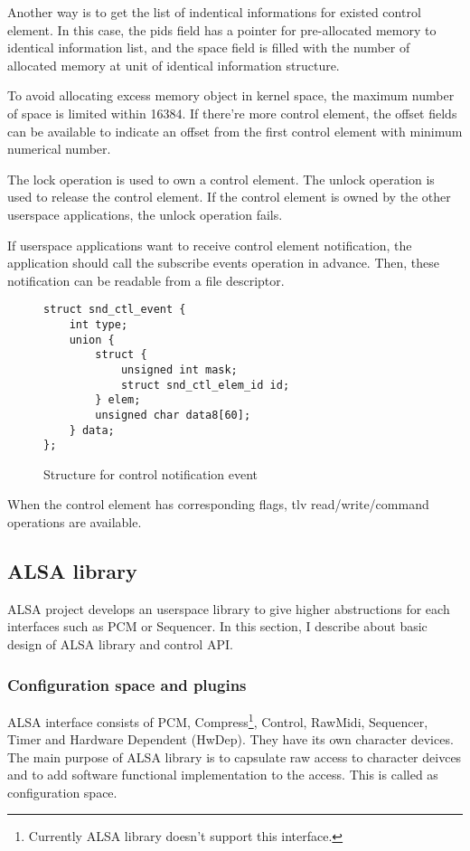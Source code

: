 \documentclass[onecolumn]{article}
\begin{document}
Another way is to get the list of indentical informations for existed control element. In this case, the pids field has a pointer for pre-allocated memory to identical information list, and the space field is filled with the number of allocated memory at unit of identical information structure.

To avoid allocating excess memory object in kernel space, the maximum number of space is limited within 16384. If there're more control element, the offset fields can be available to indicate an offset from the first control element with minimum numerical number.

The lock operation is used to own a control element. The unlock operation is used to release the control element. If the control element is owned by the other userspace applications, the unlock operation fails.

If userspace applications want to receive control element notification, the application should call the subscribe events operation in advance. Then, these notification can be readable from a file descriptor.

\begin{figure}[htbp]
\small
\begin{verbatim}
struct snd_ctl_event {
    int type;
    union {
        struct {
            unsigned int mask;
            struct snd_ctl_elem_id id;
        } elem;
        unsigned char data8[60];
    } data;
};
\end{verbatim}
\caption{{Structure for control notification event}}
\label{snd-ctl-event}
\end{figure}

When the control element has corresponding flags, tlv read/write/command operations are available.


\subsection{ALSA library}

ALSA project develops an userspace library to give higher abstructions for each interfaces such as PCM or Sequencer. In this section, I describe about basic design of ALSA library and control API.


\subsubsection{Configuration space and plugins}

ALSA interface consists of PCM, Compress\footnote{Currently ALSA library doesn't support this interface.}, Control, RawMidi, Sequencer, Timer and Hardware Dependent (HwDep). They have its own character devices. The main purpose of ALSA library is to capsulate raw access to character deivces and to add software functional implementation to the access. This is called as configuration space.
\end{document}
